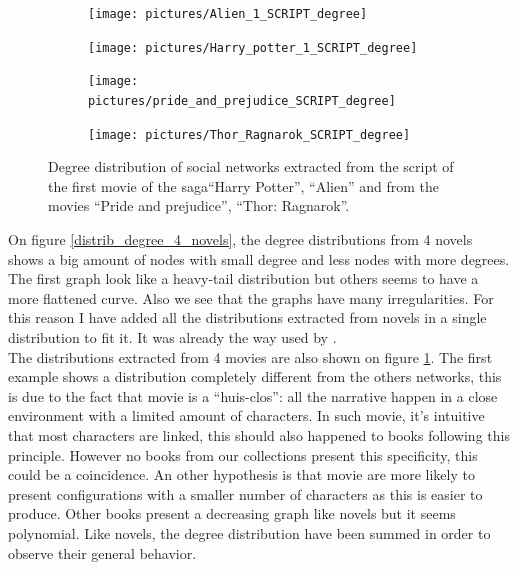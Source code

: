 \documentclass[a4paper, 12pt]{report}
\begin{document}
\begin{figure}
\begin{subfigure}{.24\textwidth}
\centering
\texttt{[image: pictures/Alien\_1\_SCRIPT\_degree]}
\end{subfigure}
\hfill
\begin{subfigure}{.24\textwidth}
\centering
\texttt{[image: pictures/Harry\_potter\_1\_SCRIPT\_degree]}
\end{subfigure}
\hfill
\begin{subfigure}{.24\textwidth}
\centering
\texttt{[image: pictures/pride\_and\_prejudice\_SCRIPT\_degree]}
\end{subfigure}
\begin{subfigure}{.24\textwidth}
\centering
\texttt{[image: pictures/Thor\_Ragnarok\_SCRIPT\_degree]}
\end{subfigure}
\caption{Degree distribution of social networks extracted from the script of the first movie of the saga``Harry Potter'', ``Alien'' and from the movies ``Pride and prejudice'', ``Thor: Ragnarok''.}
\label{distrib_degree_4_scripts}
\end{figure}

On figure \ref{distrib_degree_4_novels}, the degree distributions from 4 novels shows a big amount of nodes with small degree and less nodes with more degrees. The first graph look like a heavy-tail distribution but others seems to have a more flattened curve. Also we see that the graphs have many irregularities. For this reason I have added all the distributions extracted from novels in a single distribution to fit it. It was already the way used by \cite{original}.\\
The distributions extracted from 4 movies are also shown on figure \ref{distrib_degree_4_scripts}. The first example shows a distribution completely different from the others networks, this is due to the fact that movie is a ``huis-clos'': all the narrative happen in a close environment with a limited amount of characters. In such movie, it's intuitive that most characters are linked, this should also happened to books following this principle. However no books from our collections present this specificity, this could be a coincidence. An other hypothesis is that movie are more likely to present configurations with a smaller number of characters as this is easier to produce. Other books present a decreasing graph like novels but it seems polynomial. Like novels, the degree distribution have been summed in order to observe their general behavior.
\end{document}
